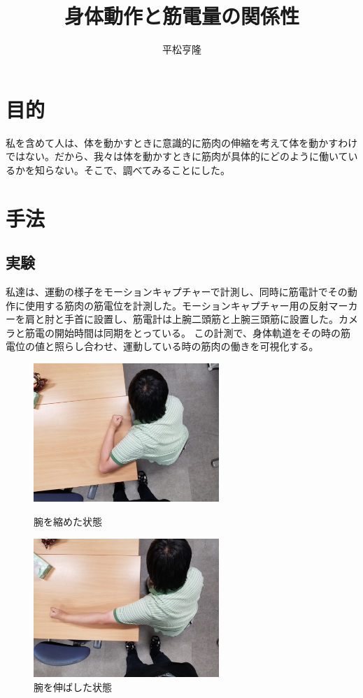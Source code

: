 \documentclass{jsarticle}
\begin{document}
\title{身体動作と筋電量の関係性}
\author{平松亨隆}
\maketitle


\section{目的}
私を含めて人は、体を動かすときに意識的に筋肉の伸縮を考えて体を動かすわけではない。だから、我々は体を動かすときに筋肉が具体的にどのように働いているかを知らない。そこで、調べてみることにした。

\section{手法}
\subsection{実験}
私達は、運動の様子をモーションキャプチャーで計測し、同時に筋電計でその動作に使用する筋肉の筋電位を計測した。モーションキャプチャー用の反射マーカーを肩と肘と手首に設置し、筋電計は上腕二頭筋と上腕三頭筋に設置した。カメラと筋電の開始時間は同期をとっている。
この計測で、身体軌道をその時の筋電位の値と照らし合わせ、運動している時の筋肉の働きを可視化する。
\begin{figure}[h]
\begin{minipage}{0.5\hsize}
\begin{center}
\includegraphics[width=7cm]{images/short.jpg}
\end{center}
\caption{腕を縮めた状態}
\label{fig:one}
\end{minipage}
\begin{minipage}{0.5\hsize}
\begin{center}
\includegraphics[width=7cm]{images/long.jpg}
\end{center}
\caption{腕を伸ばした状態}
\label{fig:two}
\end{minipage}
\end{figure}
\end{document}
